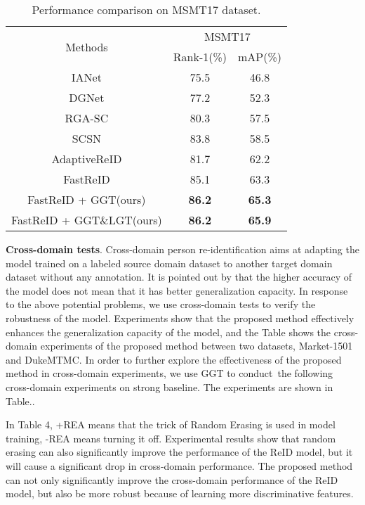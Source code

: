 \documentclass[10pt,twocolumn,letterpaper]{article}
\begin{document}
\begin{table}[]
\centering 
	\setlength\tabcolsep{3pt}\caption{Performance comparison on MSMT17 dataset.}
	\begin{tabular}{ccc}
		\hline
		\multirow{2}{*}{Methods}      & \multicolumn{2}{c}{MSMT17}                \\ \cline{2-3} 
		& Rank-1(\%)          & mAP(\%)             \\ \hline
		IANet\cite{IANet}       & 75.5                & 46.8                \\ 
		DGNet\cite{zheng2019joint}         & 77.2                & 52.3                \\ 
		RGA-SC\cite{zhang2020relation}     & 80.3                & 57.5                \\ 
		SCSN\cite{chen2020salience}        & 83.8                & 58.5                \\ 
		AdaptiveReID\cite{ni2021adaptive} & 81.7                & 62.2                \\ \hline
		FastReID\cite{FastReID}             & 85.1                & 63.3                \\ 
		FastReID + GGT(ours)          & \textbf{86.2} & \textbf{65.3}   \\ 
		FastReID + GGT\&LGT(ours)     & \textbf{86.2} & \textbf{65.9} \\ \hline
	\end{tabular}
\end{table}


\textbf{Cross-domain tests}. Cross-domain person re-identification aims at adapting the model trained on a labeled source domain dataset to another target domain dataset without any annotation. It is pointed out by\cite{stong_baseline} that the higher accuracy of the model does not mean that it has better generalization capacity. In response to the above potential problems, we use cross-domain tests to verify the robustness of the model. Experiments show that the proposed method effectively enhances the generalization capacity of the model, and the Table  shows the cross-domain experiments of the proposed method between two datasets, Market-1501\cite{market1501} and DukeMTMC\cite{duke}. In order to further explore the  effectiveness  of the proposed method in cross-domain experiments, we use GGT to conduct the following cross-domain experiments on strong baseline\cite{stong_baseline}.  The   experiments  are  shown  in Table.. 

In Table 4, +REA means that the trick of Random Erasing is used in model training, -REA means turning it off. Experimental results show that random  erasing\cite{zhong2020random} can also significantly improve the performance of the ReID model, but it will cause a significant drop in cross-domain performance. The proposed method can not only  significantly improve the cross-domain performance of the  ReID model, but also be more robust because of learning more discriminative features. 
\end{document}
